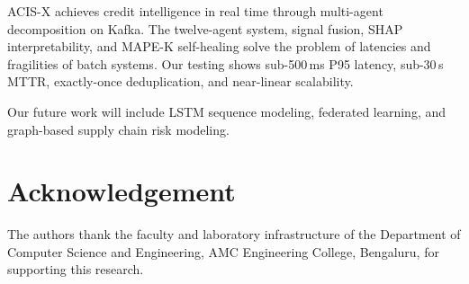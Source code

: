 ﻿\documentclass[runningheads]{llncs}
\begin{document}
ACIS-X achieves credit intelligence in real time through multi-agent decomposition on Kafka. The twelve-agent system, signal fusion, SHAP interpretability, and MAPE-K self-healing solve the problem of latencies and fragilities of batch systems. Our testing shows sub-500\,ms P95 latency, sub-30\,s MTTR, exactly-once deduplication, and near-linear scalability.

Our future work will include LSTM sequence modeling, federated learning, and graph-based supply chain risk modeling.

\section*{Acknowledgement}
The authors thank the faculty and laboratory infrastructure of the Department of Computer Science and Engineering, AMC Engineering College, Bengaluru, for supporting this research.
\end{document}
